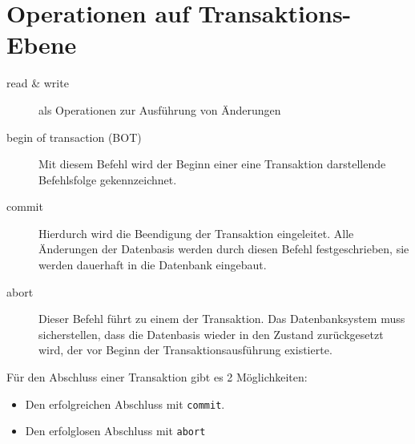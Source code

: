 \documentclass{bschlangaul-theorie}
\begin{document}
%

\section{Operationen auf Transaktions-Ebene}

\begin{bQuellen}
\item \cite[Seite 5]{db:fs:5}
\item \cite[Seite 211]{winter}
\item \cite[Kapitel 9.3, Seite 302-303]{kemper}
\end{bQuellen}

\begin{description}
\item[read \& write]

als Operationen zur Ausführung von Änderungen

\item[begin of transaction (BOT)]

Mit diesem Befehl wird der Beginn einer eine Transaktion darstellende
Befehlsfolge gekennzeichnet.

\item[commit]

Hierdurch wird die Beendigung der Transaktion eingeleitet. Alle
Änderungen der Datenbasis werden durch diesen Befehl festgeschrieben,
\dh sie werden dauerhaft in die Datenbank eingebaut.

\item[abort]

Dieser Befehl führt zu einem  der Transaktion. Das
Datenbanksystem muss sicherstellen, dass die Datenbasis wieder in den
Zustand zurückgesetzt wird, der vor Beginn der Transaktionsausführung
existierte.
\end{description}

\noindent
Für den Abschluss einer Transaktion gibt es 2 Möglichkeiten:

\begin{itemize}
\item Den erfolgreichen Abschluss mit \texttt{commit}.
\item Den erfolglosen Abschluss mit \texttt{abort}
\end{itemize}

%
\end{document}
